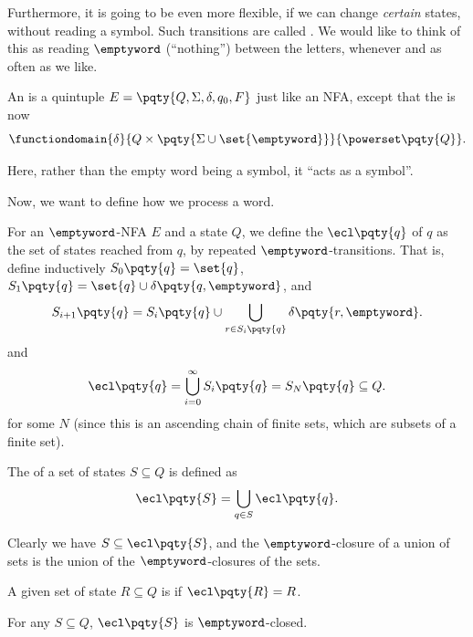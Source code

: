 Furthermore, it is going to be even more flexible, if we can change \emph{certain} states, without reading a symbol. Such transitions are called . We would like to think of this as reading \(\emptyword\) (``nothing'') between the letters, whenever and as often as we like.

\begin{definition}
    An  is a quintuple \(E = \pqty{Q, \Sigma, \delta, q_0, F}\) just like an NFA, except that the  is now
    \[
        \functiondomain{\delta}{Q \times \pqty{\Sigma \cup \set{\emptyword}}}{\powerset\pqty{Q}}.
    \]
\end{definition}

Here, rather than the empty word being a symbol, it ``acts as a symbol''.

Now, we want to define how we process a word.

\begin{definition}
    For an \(\emptyword\)-NFA \(E\) and a state \(Q\), we define the  \(\ecl\pqty{q}\) of \(q\) as the set of states reached from \(q\), by repeated \(\emptyword\)-transitions. That is, define inductively \(S_0 \pqty{q} = \set{q}\), \(S_1 \pqty{q} = \set{q} \cup \delta\pqty{q, \emptyword}\), and 
    \[
        S_{i + 1} \pqty{q} = S_i \pqty{q} \cup \bigcup_{r \in S_i\pqty{q}} \delta\pqty{r, \emptyword}.
    \]
    and
    \[
        \ecl\pqty{q} = \bigcup_{i = 0}^{\infty} S_i\pqty{q} = S_N\pqty{q} \subseteq Q.
    \]
    for some \(N\) (since this is an ascending chain of finite sets, which are subsets of a finite set).

    The  of a set of states \(S \subseteq Q\) is defined as
    \[
        \ecl\pqty{S} = \bigcup_{q \in S} \ecl\pqty{q}.
    \]

    Clearly we have \(S \subseteq \ecl\pqty{S}\), and the \(\emptyword\)-closure of a union of sets is the union of the \(\emptyword\)-closures of the sets.

    A given set of state \(R \subseteq Q\) is  if \(\ecl\pqty{R} = R\).
\end{definition}

\begin{lemma}
    For any \(S \subseteq Q\), \(\ecl\pqty{S}\) is \(\emptyword\)-closed.
\end{lemma}

